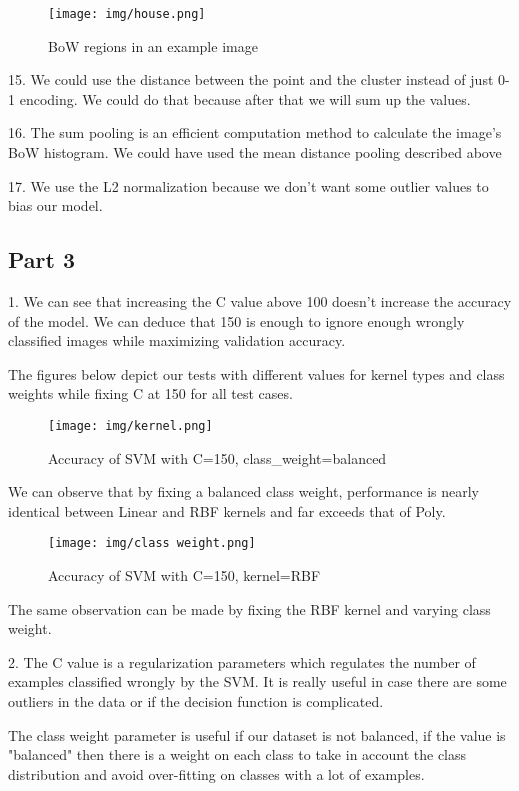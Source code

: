 \begin{figure}[H]
  \centering
    \texttt{[image: img/house.png]}
    \caption{BoW regions in an example image}
\end{figure}

15. We could use the distance between the point and the cluster instead of just 0-1 encoding. We could do that because after that we will sum up the values.

16. The sum pooling is an efficient computation method to calculate the image's BoW histogram. We could have used the mean distance pooling described above

17. We use the L2 normalization because we don't want some outlier values to bias our model.

\subsection{Part 3}

1. We can see that increasing the C value above 100 doesn't increase the accuracy of the model. We can deduce that 150 is enough to ignore enough wrongly classified images while maximizing validation accuracy.

The figures below depict our tests with different values for kernel types and class weights while fixing C at 150 for all test cases.

\begin{figure}[H]
  \centering
    \texttt{[image: img/kernel.png]}
    \caption{Accuracy of SVM with C=150, class\_weight=balanced}
\end{figure}

We can observe that by fixing a balanced class weight, performance is nearly identical between Linear and RBF kernels and far exceeds that of Poly.

\begin{figure}[H]
  \centering
    \texttt{[image: img/class weight.png]}
    \caption{Accuracy of SVM with C=150, kernel=RBF}
\end{figure}

The same observation can be made by fixing the RBF kernel and varying class weight.

2. The C value is a regularization parameters which regulates the number of examples classified wrongly by the SVM. It is really useful in case there are some outliers in the data or if the decision function is complicated.

The class weight parameter is useful if our dataset is not balanced, if the value is "balanced" then there is a weight on each class to take in account the class distribution and avoid over-fitting on classes with a lot of examples.


